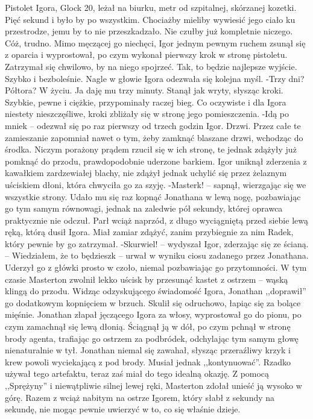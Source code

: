 \documentclass[../MAIN.tex]{subfiles}
\begin{document}
Pistolet Igora, Glock 20, leżał na biurku, metr od szpitalnej, skórzanej kozetki. Pięć sekund i było by po wszystkim. Chociażby mieliby wywiesić jego ciało ku przestrodze, jemu by to nie przeszkadzało. Nie czułby już kompletnie niczego.
Cóż, trudno.
Mimo męczącej go niechęci, Igor jednym pewnym ruchem zsunął się z oparcia i wyprostował, po czym wykonał pierwszy krok w stronę pistoletu. Zatrzymał się chwilowo, by na niego spojrzeć. Tak, to będzie najlepsze wyjście. Szybko i bezboleśnie.
Nagle w głowie Igora odezwała się kolejna myśl.
-Trzy dni? Półtora? W życiu. Ja daję mu trzy minuty.
Stanął jak wryty, słysząc kroki. Szybkie, pewne i ciężkie, przypominały raczej bieg. Co oczywiste i dla Igora niestety nieszczęśliwe, kroki zbliżały się w stronę jego pomieszczenia.
-Idą po mnie\3k -- odezwał się po raz pierwszy od trzech godzin Igor.
Drzwi.
Przez całe te zamieszanie zapomniał nawet o tym, żeby zamknąć blaszane drzwi, wchodząc do środka. Niczym porażony prądem rzucił się w ich stronę, te jednak zdążyły już pomknąć do przodu, prawdopodobnie uderzone barkiem. Igor uniknął zderzenia z kawałkiem zardzewiałej blachy, nie zdążył jednak uchylić się przez żelaznym uściskiem dłoni, która chwyciła go za szyję.
-Master\3k! -- sapnął, wierzgając się we wszystkie strony. Udało mu się raz kopnąć Jonathana w lewą nogę, pozbawiając go tym samym równowagi, jednak na zaledwie pół sekundy, której oprawca praktycznie nie odczuł. Parł wciąż naprzód, z długo wyciągniętą przed siebie lewą ręką, którą dusił Igora. Miał zamiar zdążyć, zanim przybiegnie za nim Radek, który pewnie by go zatrzymał.
-Skurwiel! -- wydyszał Igor, zderzając się ze ścianą. -- Wiedziałem, że to będziesz\3k -- urwał w wyniku ciosu zadanego przez Jonathana. Uderzył go z główki prosto w czoło, niemal pozbawiając go przytomności. W tym czasie Masterton zwolnił lekko uścisk by przesunąć kastet z ostrzem -- wąską klingą do przodu. Widząc odzyskującego świadomość Igora, Jonathan ,,doprawił'' go dodatkowym kopnięciem w brzuch. Skulił się odruchowo, łapiąc się za bolące mięśnie. Jonathan złapał jęczącego Igora za włosy, wyprostował go do pionu, po czym zamachnął się lewą dłonią. Ściągnął ją w dół, po czym pchnął w stronę brody agenta, trafiając go ostrzem za podbródek, odchylając tym samym głowę nienaturalnie w tył.
Jonathan niemal się zawahał, słysząc przeraźliwy krzyk i krew powoli wyciekającą z pod brody. Musiał jednak ,,kontynuować''. Rzadko używał tego artefaktu, teraz zaś miał do tego idealną okazję.
Z pomocą ,,Sprężyny'' i niewątpliwie silnej lewej ręki, Masterton zdołał unieść ją wysoko w górę. Razem z wciąż nabitym na ostrze Igorem, który słabł z sekundy na sekundę, nie mogąc pewnie uwierzyć w to, co się właśnie dzieje.
\end{document}
